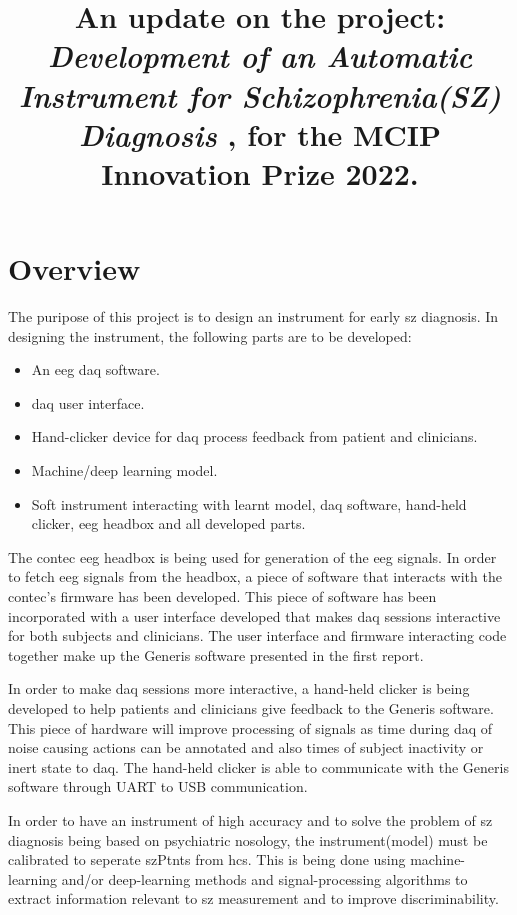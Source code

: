 \documentclass[10pt]{article}
\title{
  An update on the project: 
  \textbf{
      \textit{
        Development of an Automatic Instrument for Schizophrenia(SZ) Diagnosis
        }
      }, for the MCIP Innovation Prize 2022.
  }
\begin{document}
\maketitle

\section{Overview}
The puripose of this project is to design an instrument for early \gls{sz} diagnosis.
In designing the instrument, the following parts are to be developed:
\begin{itemize}
  \item An \gls{eeg} \gls{daq} software.
  \item \gls{daq} user interface.
  \item Hand-clicker device for \gls{daq} process feedback from patient and clinicians.
  \item Machine/deep learning model.
  \item Soft instrument interacting with learnt model, \gls{daq} software, hand-held 
  clicker, \gls{eeg} headbox and all developed parts.
  
\end{itemize}

The contec \gls{eeg} headbox is being used for generation of the \gls{eeg} signals.
In order to fetch \gls{eeg} signals from the headbox, a piece of software that interacts 
with the contec's firmware has been developed. This piece of software has been incorporated 
with a user interface developed that makes \gls{daq} sessions interactive for both 
subjects and clinicians. The user interface and firmware interacting code together make 
up the Generis software presented in the first report.

In order to make \gls{daq} sessions more interactive, a hand-held clicker is being developed 
to help patients and clinicians give feedback to the Generis software. This piece of hardware 
will improve processing of signals as time during \gls{daq} of noise causing actions can be 
annotated and also times of subject inactivity or inert state to \gls{daq}. The hand-held clicker 
is able to communicate with the Generis software through UART to USB communication.

In order to have an instrument of high accuracy and to solve the problem of \gls{sz} diagnosis 
being based on psychiatric nosology, the instrument(model) must be calibrated to seperate 
\glspl{szPtnt} from \glspl{hc}. This is being done using machine-learning and/or 
deep-learning methods and signal-processing algorithms to extract information relevant to 
\gls{sz} measurement and to improve discriminability.
\end{document}
